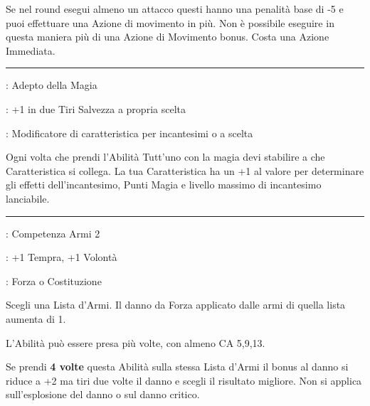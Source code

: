 \begin{multicols}{2}
Se nel round esegui almeno un attacco questi hanno una penalità base di -5 e puoi effettuare una Azione di movimento in più. Non è possibile eseguire in questa maniera più di una Azione di Movimento bonus. Costa una Azione Immediata.

\smallskip\noindent\rule{\linewidth}{2pt} \hypertarget{Tutt'uno con la magia}{}\medskip{}\label{Tutt'uno con la magia}
\noindent
\begin{description}[noitemsep, topsep=0pt, parsep=0pt, partopsep=0pt, leftmargin=0cm, labelwidth=2.5cm]
    \item[\textbf{Requisito}]: Adepto della Magia
    \item[\textbf{Tiri Salvezza}]: +1 in due Tiri Salvezza a propria scelta
    \item[\textbf{Caratteristica}]: Modificatore di caratteristica per incantesimi o a scelta
\end{description}

Ogni volta che prendi l'Abilità Tutt'uno con la magia devi stabilire a che Caratteristica si collega.
La tua Caratteristica ha un +1 al valore per determinare gli effetti dell'incantesimo, Punti Magia e livello massimo di incantesimo lanciabile.

\smallskip\noindent\rule{\linewidth}{2pt} \hypertarget{Un braccio, un arma}{}\medskip{}
\noindent
\begin{description}[noitemsep, topsep=0pt, parsep=0pt, partopsep=0pt, leftmargin=0cm, labelwidth=2.5cm]
    \item[\textbf{Requisito}]: Competenza Armi 2
    \item[\textbf{Tiri Salvezza}]: +1 Tempra, +1 Volontà
    \item[\textbf{Caratteristica}]: Forza o Costituzione
\end{description}

Scegli una Lista d'Armi. Il danno da Forza applicato dalle armi di quella lista aumenta di 1.

L’Abilità può essere presa più volte, con almeno CA 5,9,13.

Se prendi \textbf{4 volte} questa Abilità sulla stessa Lista d'Armi il bonus al danno si riduce a +2 ma tiri due volte il danno e scegli il risultato migliore. Non si applica sull'esplosione del danno o sul danno critico.


\end{multicols}
